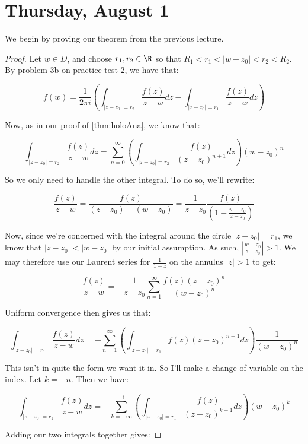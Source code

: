 \section{Thursday, August 1}


We begin by proving our theorem from the previous lecture.

\begin{proof} Let $w\in D$, and choose $r_1,r_2 \in \R$ so that $R_1 < r_1 < |w-z_0| < r_2 < R_2$. By problem 3b on practice test 2, we have that:

$$f(w) = \frac{1}{2\pi i}\left(\int_{|z-z_0| = r_2} \frac{f(z)}{z-w}dz - \int_{|z-z_0| = r_1} \frac{f(z)}{z-w}dz\right)$$

Now, as in our proof of \ref{thm:holoAna}, we know that:

$$\int_{|z-z_0| = r_2} \frac{f(z)}{z-w}dz = \sum_{n =0}^\infty \left(\int_{|z-z_0| = r_2} \frac{f(z)}{(z-z_0)^{n+1}}dz\right) (w-z_0)^n$$

So we only need to handle the other integral. To do so, we'll rewrite:

$$\frac{f(z)}{z-w} = \frac{f(z)}{(z-z_0) - (w-z_0)} = \frac{1}{z-z_0} \frac{f(z)}{\left(1 - \frac{w-z_0}{z-z_0}\right)}$$

Now, since we're concerned with the integral around the circle $|z-z_0| = r_1$, we know that $|z-z_0| < |w-z_0|$ by our initial assumption. As such, $\left|\frac{w-z_0}{z-z_0}\right| > 1$. We may therefore use our Laurent series for $\frac{1}{1-z}$ on the annulus $|z|> 1$ to get:

$$\frac{f(z)}{z-w} = -\frac{1}{z-z_0}\sum_{n = 1}^\infty \frac{f(z)(z-z_0)^n}{(w-z_0)^n}$$

Uniform convergence then gives us that:

$$\int_{|z-z_0| = r_1} \frac{f(z)}{z-w}dz = -\sum_{n = 1}^\infty \left(\int_{|z-z_0| = r_1} f(z)(z-z_0)^{n-1}dz\right)\frac{1}{(w-z_0)^n}$$

This isn't in quite the form we want it in. So I'll make a change of variable on the index. Let $k = -n$. Then we have:

$$\int_{|z-z_0| = r_1} \frac{f(z)}{z-w}dz =-\sum_{k = -\infty}^{-1} \left(\int_{|z-z_0| = r_1} \frac{f(z)}{(z-z_0)^{k+1}}dz\right)(w-z_0)^{k}$$

Adding our two integrals together gives:


\end{proof}
